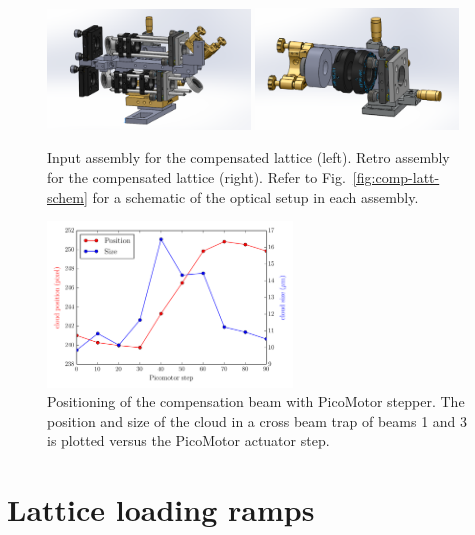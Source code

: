 \begin{figure}
    \centering
\includegraphics[width=0.48\textwidth]{../figures/lattice-assm/lattice-input-assembly.png}
\includegraphics[width=0.48\textwidth]{../figures/lattice-assm/lattice-retro-assembly.png}
\caption{\small Input assembly for the compensated lattice (left).  Retro
assembly for the compensated lattice (right).  Refer to
Fig.~\ref{fig:comp-latt-schem} for a schematic of the optical setup in each
assembly.}
\label{fig:input-stage}
\end{figure}
\begin{figure}
    \centering
\includegraphics[width=0.58\textwidth]{../ernie-figures/lattice/overlap/pico.png}
\caption{\small Positioning of the compensation beam with PicoMotor stepper.
The position and size of the cloud in a cross beam trap of beams 1  and 3 is
plotted versus the PicoMotor actuator step. }
\label{fig:movepico}
\end{figure}

\section{Lattice loading ramps}

